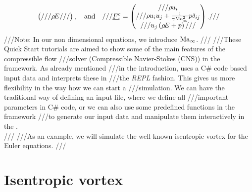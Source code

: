 {\begin{align*}
\begin{pmatrix}
///  \energy{}
///\end{pmatrix}, \quad \textrm{and} \quad
///\vec{F}^c_i = \begin{pmatrix}
///  \momentum_i\\
///  \momentum_i \velocity_j + \frac{1}{\heatCapacityRatio \reference{\Mach}^2}\pressure \delta_{ij}\\
///  \velocity_j \left(\energy{}+\pressure{}\right)
///\end{pmatrix}.
///\end{align*}
///Note: In our non dimensional equations, we introduce ${\mathrm{Ma}}_{\infty}$. 
///
///These Quick Start tutorials are aimed to show some of the main features of the compressible flow 
///solver (Compressible Navier-Stokes (CNS)) in the \BoSSS{} framework. As already mentioned 
///in the introduction, \BoSSS{} uses a C\# code based input data and interprets these in 
///the \emph{REPL} fashion. This gives us more flexibility in the way how we can start a 
///simulation. We can have the traditional way of defining an input file, where we define all 
///important parameters in C\# code, or we can also use some predefined functions in the framework 
///to generate our input data and manipulate them interactively in the \BoSSSpad{}.\\ 
///
///As an example, we will simulate the well known isentropic vortex for the Euler equations. 
///\section{Isentropic vortex}
 }
\BoSSSexe
{}
\BoSSSexeSilent
{}
\BoSSSexe
{}
\BoSSSexe
{}
\BoSSSexe
{}
\BoSSSexe
